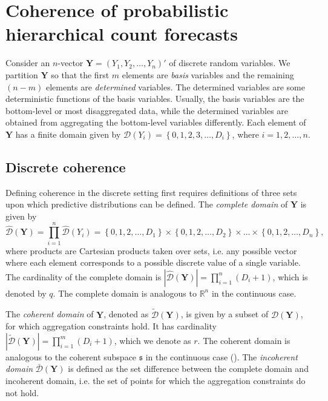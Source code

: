 \documentclass[a4paper,review,12pt,authoryear]{elsarticle}
\newcommand{\bY}{\mathbf{Y}}
\theoremstyle{definition}
\begin{document}
\section{Coherence of probabilistic hierarchical count forecasts}

\label{sec:coherence}


Consider an $n$-vector $\bY=\left(Y_1,Y_2,\ldots,Y_n\right)'$ of discrete random variables.
We partition $\bY$ so that the first $m$ elements are \textit{basis} variables and the remaining $(n-m)$ elements are \textit{determined} variables.
The determined variables are some deterministic functions of the basis variables. Usually, the basis variables are the bottom-level or most disaggregated data, while the determined variables are obtained from aggregating the bottom-level variables differently.
Each element of $\bY$ has a finite domain given by $\mathcal{D}(Y_i)=\left\{0, 1,2,3,\dots,D_i\right\}$, where $i = 1, 2, \dots, n$.

\subsection{Discrete coherence}\label{sec:domains}

Defining coherence in the discrete setting first requires definitions of three sets upon which predictive distributions can be defined. The \textit{complete domain} of $\bY$ is given by
\[
\hat{\mathcal D}(\bY)=\prod\limits_{i=1}^n\hat{\mathcal D}(Y_i)=\left\{0, 1,2,\dots,D_1\right\}\times\left\{0,1,2,\dots,D_2\right\}\times\dots\times\left\{0,1,2,\dots,D_n\right\},
\]
where products are Cartesian products taken over sets, i.e. any possible vector where each element corresponds to a possible discrete value of a single variable.
The cardinality of the complete domain is $|\hat{\mathcal D}(\bY)|=\prod\limits_{i=1}^{n} (D_i+1)$, which is denoted by $q$.
The complete domain is analogous to $\mathbb{R}^n$ in the continuous case.

The \textit{coherent domain} of $\bY$, denoted as $\tilde{\mathcal D}(\bY)$, is given by a subset of $\hat{\mathcal D}(\bY)$, for which aggregation constraints hold.
It has cardinality $|\tilde{\mathcal D}(\bY)|=\prod\limits_{i=1}^{m} (D_i+1)$, which we denote as $r$.
The coherent domain is analogous to the coherent subspace $\mathfrak{s}$ in the continuous case (\citealp{panagiotelisProbabilisticForecastReconciliation2022}). The \textit{incoherent domain} $\bar{\mathcal D}(\bY)$ is defined as the set difference between the complete domain and incoherent domain, i.e. the set of points for which the aggregation constraints do not hold.
\end{document}
